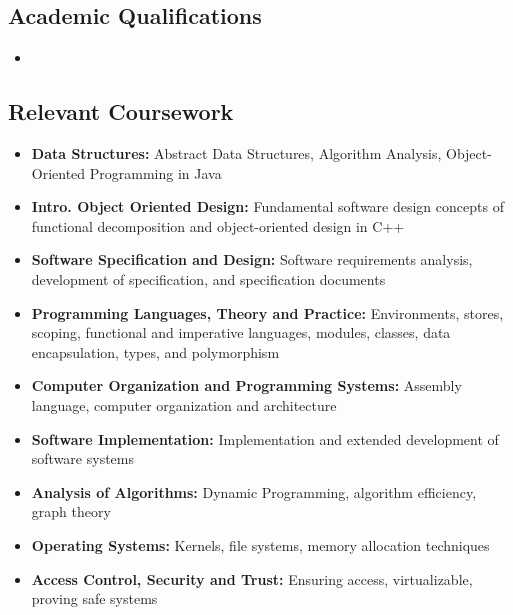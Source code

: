 \documentclass[11pt,a4paper,roman]{moderncv}        %
\begin{document}
\vspace{0pt}

\subsection{Academic Qualifications}

\vspace{0pt}

\begin{itemize}

\item{}

\end{itemize}

\vspace{2pt}

\subsection{Relevant Coursework}

\vspace{1pt}

\begin{itemize}

  \item{\textbf{Data Structures:} Abstract Data Structures, Algorithm Analysis, Object-Oriented Programming in Java}
  \item{\textbf{Intro. Object Oriented Design:} Fundamental software design concepts of functional decomposition and object-oriented design in C++}
  \item{\textbf{Software Specification and Design:} Software requirements analysis, development of specification, and specification documents}
  \item{\textbf{Programming Languages, Theory and Practice:} Environments, stores, scoping, functional and imperative languages, modules, classes, data encapsulation, types, and polymorphism}
  \item{\textbf{Computer Organization and Programming Systems:} Assembly language, computer organization and architecture}
  \item{\textbf{Software Implementation:} Implementation and extended development of software systems}
  \item{\textbf{Analysis of Algorithms:} Dynamic Programming, algorithm efficiency, graph theory}
  \item{\textbf{Operating Systems:} Kernels, file systems, memory allocation techniques}
  \item{\textbf{Access Control, Security and Trust:} Ensuring access, virtualizable, proving safe systems}

\end{itemize}
\end{document}
